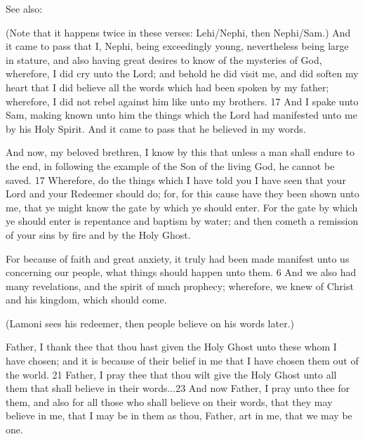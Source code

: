 		\begin{compactdesc}
		
		\item[13--14$\vert$]
		\begin{compactdesc}
		\item[to some...to others...] See also:
			\begin{compactdesc}
			\item[1N 2:16--17] (Note that it happens twice in these verses: Lehi/Nephi, then Nephi/Sam.) And it came to pass that I, Nephi, being exceedingly young, nevertheless being large in stature, and also having great desires to know of the mysteries of God, wherefore, I did cry unto the Lord; and behold he did visit me, and did soften my heart that I did believe all the words which had been spoken by my father; wherefore, I did not rebel against him like unto my brothers. 17 And I spake unto Sam, making known unto him the things which the Lord had manifested unto me by his Holy Spirit. And it came to pass that he believed in my words.
			\item[2N 31:16--17] And now, my beloved brethren, I know by this that unless a man shall endure to the end, in following the example of the Son of the living God, he cannot be saved. 17 Wherefore, do the things which I have told you I have seen that your Lord and your Redeemer should do; for, for this cause have they been shown unto me, that ye might know the gate by which ye should enter. For the gate by which ye should enter is repentance and baptism by water; and then cometh a remission of your sins by fire and by the Holy Ghost.
			\item[Jac 1:5--6] For because of faith and great anxiety, it truly had been made manifest unto us concerning our people, what things should happen unto them. 6 And we also had many revelations, and the spirit of much prophecy; wherefore, we knew of Christ and his kingdom, which should come.
			\item[Al 19:13, 31] (Lamoni sees his redeemer, then people believe on his words later.)
			\item[3N 19:20--21, 23] Father, I thank thee that thou hast given the Holy Ghost unto these whom I have chosen; and it is because of their belief in me that I have chosen them out of the world. 21 Father, I pray thee that thou wilt give the Holy Ghost unto all them that shall believe in their words...23 And now Father, I pray unto thee for them, and also for all those who shall believe on their words, that they may believe in me, that I may be in them as thou, Father, art in me, that we may be one.

\end{compactdesc}
\end{compactdesc}
\end{compactdesc}
